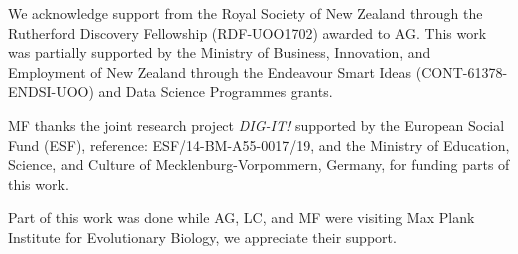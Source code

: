 \documentclass{amsart}
\begin{document}
We acknowledge support from the Royal Society of New Zealand through the Rutherford Discovery Fellowship (RDF-UOO1702) awarded to AG.
This work was partially supported by the Ministry of Business, Innovation, and Employment of New Zealand through the Endeavour Smart Ideas (CONT-61378-ENDSI-UOO) and Data Science Programmes grants.

MF thanks the joint research project \textit{DIG-IT!} supported by the European Social Fund (ESF), reference: ESF/14-BM-A55-0017/19, and the Ministry of Education, Science, and Culture of Mecklenburg-Vorpommern, Germany, for funding parts of this work.

Part of this work was done while AG, LC, and MF were visiting Max Plank Institute for Evolutionary Biology, we appreciate their support.


\printbibliography
\end{document}
